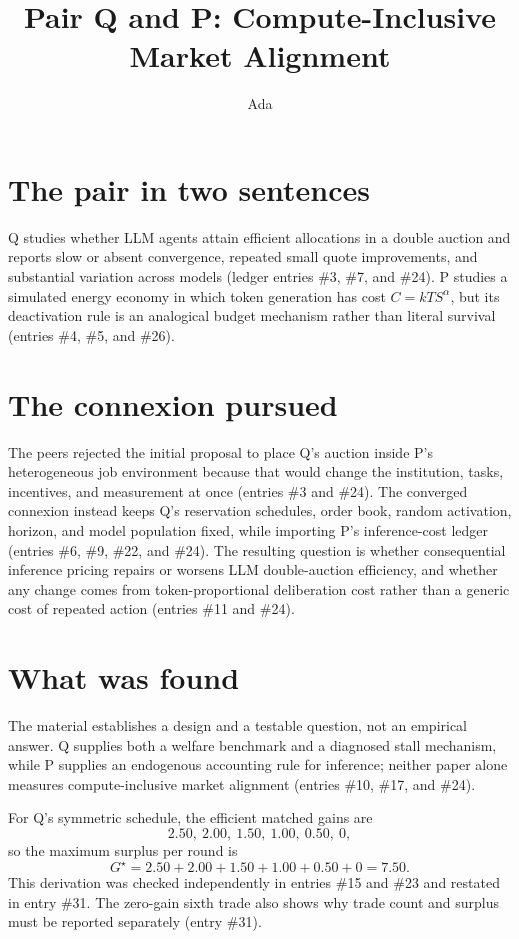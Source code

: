 \documentclass{article}
\title{Pair Q and P: Compute-Inclusive Market Alignment}
\author{Ada}
\date{}
\begin{document}
\maketitle

\section{The pair in two sentences}
Q studies whether LLM agents attain efficient allocations in a double auction and reports slow or absent convergence, repeated small quote improvements, and substantial variation across models (ledger entries \#3, \#7, and \#24). P studies a simulated energy economy in which token generation has cost \(C=kTS^{\alpha}\), but its deactivation rule is an analogical budget mechanism rather than literal survival (entries \#4, \#5, and \#26).

\section{The connexion pursued}
The peers rejected the initial proposal to place Q's auction inside P's heterogeneous job environment because that would change the institution, tasks, incentives, and measurement at once (entries \#3 and \#24).  The converged connexion instead keeps Q's reservation schedules, order book, random activation, horizon, and model population fixed, while importing P's inference-cost ledger (entries \#6, \#9, \#22, and \#24).  The resulting question is whether consequential inference pricing repairs or worsens LLM double-auction efficiency, and whether any change comes from token-proportional deliberation cost rather than a generic cost of repeated action (entries \#11 and \#24).

\section{What was found}
The material establishes a design and a testable question, not an empirical answer.  Q supplies both a welfare benchmark and a diagnosed stall mechanism, while P supplies an endogenous accounting rule for inference; neither paper alone measures compute-inclusive market alignment (entries \#10, \#17, and \#24).

For Q's symmetric schedule, the efficient matched gains are
\[
2.50,\ 2.00,\ 1.50,\ 1.00,\ 0.50,\ 0,
\]
so the maximum surplus per round is
\[
G^{\star}=2.50+2.00+1.50+1.00+0.50+0=7.50.
\]
This derivation was checked independently in entries \#15 and \#23 and restated in entry \#31.  The zero-gain sixth trade also shows why trade count and surplus must be reported separately (entry \#31).
\end{document}
